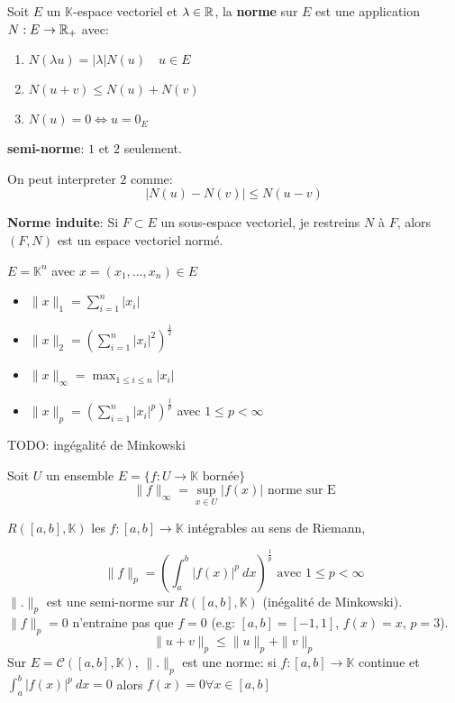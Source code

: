 \begin{definition}
    Soit $E$ un  $\mathbb{K}$-espace vectoriel et $\lambda \in \mathbb{R}$, la \textbf{norme} sur  $E$ est une application $N: E \to \mathbb{R}_{+}$ avec:
    \begin{enumerate}
        \item $N(\lambda u) = |\lambda|N(u) \quad u \in E$
        \item $N(u + v) \le N(u) + N(v)$
        \item $N(u) = 0 \iff u = 0_{E}$
    \end{enumerate}
    \textbf{semi-norme}: $1$ et  $2$ seulement.
\end{definition}

On peut interpreter $2$ comme:
 \[
\left| N(u) - N(v) \right| \le N(u - v)
\] 

\begin{prop}
    \textbf{Norme induite}: Si $F \subset E$ un sous-espace vectoriel, je restreins $N$ à  $F$, alors  $(F, N)$ est un espace vectoriel normé.
\end{prop}

\begin{eg}
    $E = \mathbb{K}^n$ avec  $x = (x_1, \ldots, x_n) \in E$ 
    \begin{itemize}
        \item $\|x\|_1 = \sum_{i=1}^{n} |x_i|$
        \item $\|x\|_2 = \left(\sum_{i=1}^{n} |x_i|^2\right)^{\frac{1}{2}}$
        \item $\|x\|_{\infty} = \max_{1 \le i \le n} |x_i|$
        \item $\|x\|_p = \left( \sum_{i=1}^{n} |x_i|^p \right)^{\frac{1}{p}}$ avec $1 \le p < \infty$
    \end{itemize}
\end{eg}

TODO: ingégalité de Minkowski

\begin{definition}
    Soit $U$  un ensemble $E = \{f: U \to \mathbb{K} \text{ bornée} \}$ 
    \[
        \|f\|_{\infty} = \sup_{x \in U} |f(x)| \text{ norme sur E}
    \] 
\end{definition}
\begin{definition}
    $R([a, b], \mathbb{K})$ les  $f: [a, b] \to \mathbb{K}$ intégrables au sens de Riemann,
\end{definition}

\begin{eg}
    \[
        \|f\|_{p} = \left( \int_{{a}}^{{b}} {|f(x)|^{p}} \: d{x} {} \right)^{\frac{1}{p}} \text{ avec } 1 \le p < \infty
    \] 
    $\| . \|_{p}$ est une semi-norme sur $R([a, b], \mathbb{K})$ (inégalité de Minkowski). $\|f\|_{p} = 0$ n'entraine pas que $f = 0$ (e.g: $[a, b] = [-1, 1]$,  $f(x) = x$, $p = 3$). 
    \[
        \|u + v\|_{p} \le \|u\|_p + \|v\|_p
    \] 
    Sur $E = \mathcal{C}([a, b], \mathbb{K})$,  $\| . \|_{p}$ est une norme:
    si $f: [a, b] \to \mathbb{K}$ continue et $\int_{{a}}^{{b}} {|f(x)|^p} \: d{x} = 0$ alors $f(x) = 0 \forall x \in [a, b]$
\end{eg}

